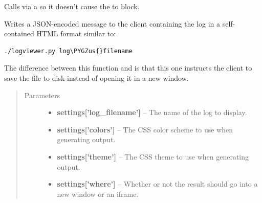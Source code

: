 \documentclass[letterpaper,10pt,openany]{sphinxmanual}
\def\PYGZus{\char`\_}
\begin{document}

\begin{fulllineitems}
\label{Applications/terminal/plugin_logging:logging_plugin.save_log_playback}
Calls {\hyperref[Applications/terminal/plugin_logging:logging_plugin._save_log_playback]{}} via a 
so it doesn't cause the  to block.

\end{fulllineitems}


\begin{fulllineitems}
\label{Applications/terminal/plugin_logging:logging_plugin._save_log_playback}
Writes a JSON-encoded message to the client containing the log in a
self-contained HTML format similar to:

\begin{Verbatim}[commandchars=\\\{\}]
./logviewer.py log\PYGZus{}filename
\end{Verbatim}

The difference between this function and {\hyperref[Applications/terminal/plugin_logging:logging_plugin._retrieve_log_playback]{}}
is that this one instructs the client to save the file to disk instead of
opening it in a new window.
\begin{quote}\begin{description}
\item[{Parameters}] \leavevmode\begin{itemize}
\item {} 
\textbf{settings{[}'log\_filename'{]}} -- The name of the log to display.

\item {} 
\textbf{settings{[}'colors'{]}} -- The CSS color scheme to use when generating output.

\item {} 
\textbf{settings{[}'theme'{]}} -- The CSS theme to use when generating output.

\item {} 
\textbf{settings{[}'where'{]}} -- Whether or not the result should go into a new window or an iframe.


\end{itemize}
\end{description}
\end{quote}
\end{fulllineitems}
\end{document}
